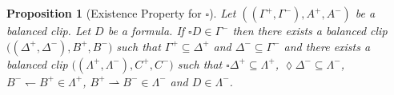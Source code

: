 \documentclass[draft]{article}
\newtheorem{proposition}{Proposition}
\begin{document}
%
%
%
%
%
%
%
%
%
%
%
%
%
%
\begin{proposition}[Existence Property for $\square$]\label{Proposition:let:be:a:balanced:clip:let:be:a:formula:if:then:for:all:balanced:clips:if:and:then:there:exists:a:balanced:clip:such:that:and:2:square:Gamma:moins}
%
%
Let $((\Gamma^{+},\Gamma^{-}),A^{+},A^{-})$ be a balanced clip.
Let $D$ be a formula.
If ${\square}D{\in}\Gamma^{-}$ then there exists a balanced clip $((\Delta^{+},\Delta^{-}),B^{+},
%
%
%
%
%
%
%
$\linebreak$
%
%
%
%
%
%
B^{-})$ such that $\Gamma^{+}{\subseteq}\Delta^{+}$ and $\Delta^{-}{\subseteq}\Gamma^{-}$ and there exists a balanced clip $((\Lambda^{+},\Lambda^{-}),C^{+},
%
%
%
%
%
%
%
$\linebreak$
%
%
%
%
%
%
C^{-})$ such that ${\square}\Delta^{+}{\subseteq}\Lambda^{+}$, ${\lozenge}\Delta^{-}{\subseteq}\Lambda^{-}$, $B^{-}{\leftharpoondown}B^{+}{\in}\Lambda^{+}$, $B^{+}{\rightharpoonup}B^{-}{\in}\Lambda^{-}$ and $D{\in}\Lambda^{-}$.
%
%
\end{proposition}
\end{document}
